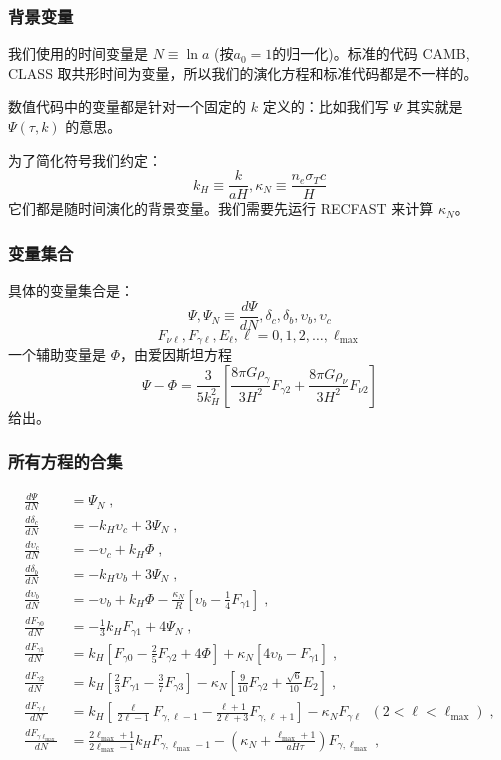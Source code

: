 \documentclass[CJK,13pt]{beamer}
\begin{document}


  \begin{frame}
    \frametitle{背景变量}
    我们使用的时间变量是 $N\equiv \ln a$ (按$a_0=1$的归一化)。标准的代码 CAMB, CLASS 取共形时间为变量，所以我们的演化方程和标准代码都是不一样的。

    \skipline
    
    数值代码中的变量都是针对一个固定的 $k$ 定义的：比如我们写 $\Psi$ 其实就是 $\Psi(\tau, k)$ 的意思。

    \skipline
    
    为了简化符号我们约定：
    $$k_H\equiv \frac{k}{aH}, \kappa_N \equiv \frac{n_e\sigma_Tc}{H}$$
    它们都是随时间演化的背景变量。我们需要先运行 RECFAST 来计算 $\kappa_N$。
  \end{frame}

  \begin{frame}    
    \frametitle{变量集合}    
    具体的变量集合是：
    $$\Psi, \Psi_N \equiv \frac{d\Psi}{dN}, \delta_c, \delta_b, \upsilon_{b}, \upsilon_{c}$$ 
    $$F_{\nu\ell},F_{\gamma\ell}, E_{\ell},  \ell = 0,1,2,\ldots, \ell_{\max}$$
    一个辅助变量是 $\Phi$，由爱因斯坦方程
    $$ \Psi - \Phi = \frac{3}{5k_H^2}\left[\frac{8\pi G\rho_\gamma}{3H^2}F_{\gamma 2} + \frac{8\pi G\rho_\nu}{3H^2}F_{\nu 2} \right]$$
    给出。
  \end{frame}
  
  \begin{frame}
    \frametitle{所有方程的合集}
{\tiny
\begin{align}
\frac{d\Psi}{dN} &= \Psi_N\; ,\\
 \frac{d\delta_c}{dN} &= - k_H \upsilon_{c} + 3 \Psi_N \;,\\
 \frac{d \upsilon_{c}}{dN} &= - \upsilon_{c} + k_H \Phi \; , \\
\frac{d\delta_b}{dN} &= - k_H \upsilon_{b} + 3 \Psi_N \;, \\
\frac{d\upsilon_{b}}{dN} &= - \upsilon_{b} + k_H\Phi - \frac{\kappa_N}{R} \left[\upsilon_{b} - \frac{1}{4}F_{\gamma 1}\right]\;,\\
\frac{d F_{\gamma 0}}{dN} &=  - \frac{1}{3} k_H F_{\gamma 1} + 4 \Psi_N\;,  \label{eq:hiestart}\\
\frac{d F_{\gamma 1}}{dN} &= k_H\left[  F_{\gamma 0} - \frac{2}{5} F_{\gamma 2} + 4 \Phi\right] + \kappa_N \left[4\upsilon_{b} - F_{\gamma 1}\right]\;,\\
\frac{d F_{\gamma 2}}{dN} &= k_H\left[ \frac{2}{3} F_{\gamma 1} - \frac{3}{7} F_{\gamma 3} \right] - \kappa_N \left[\frac{9}{10}F_{\gamma 2}+\frac{\sqrt{6}}{10}E_2\right]\;,\\
\frac{d F_{\gamma \ell}}{dN} &= k_H \left[\frac{\ell}{2\ell - 1} F_{\gamma,\ell - 1} - \frac{\ell+1}{2\ell + 3} F_{\gamma,\ell+1}\right] - \kappa_N F_{\gamma \ell}\; \;(2<\ell<\ell_{\max})\;,\\
\frac{dF_{\gamma \ell_{\max}}}{dN} &= \frac{2\ell_{\max}+1}{2\ell_{\max}-1} k_HF_{\gamma, \ell_{\max}-1} - \left(\kappa_N + \frac{\ell_{\max}+1}{aH\tau}\right) F_{\gamma, \ell_{\max}}\;,
\end{align}}
  \end{frame}
\end{document}
